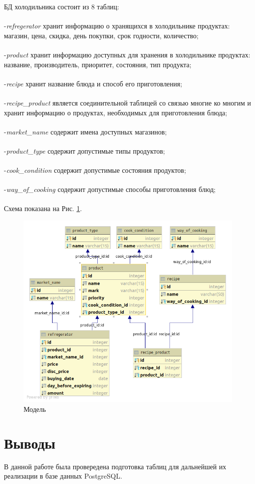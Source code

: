 \newpage
БД холодильника состоит из 8 таблиц:
\\\\-\textit{refregerator} хранит информацию о хранящихся в холодильнике продуктах: магазин, цена, скидка, день покупки, срок годности, количество;
\\\\-\textit{product} хранит информацию доступных для хранения в холодильнике продуктах: название, производитель, приоритет, состояния, тип продукта;
\\\\-\textit{recipe} хранит название блюда и способ его приготовления;
\\\\-\textit{recipe\_product} является соединительной таблицей со связью многие ко многим и хранит информацию о продуктах, необходимых для приготовления блюда;
\\\\-\textit{market\_name} содержит имена доступных магазинов;
\\\\-\textit{product\_type} содержит допустимые типы продуктов;
\\\\-\textit{cook\_condition} содержит допустимые состояния продуктов;
\\\\-\textit{way\_of\_cooking} содержит допустимые способы приготовления блюд;
\\\\




Схема показана на Рис. \ref{pic:db-schema}.

\begin{figure}[H]
	\begin{center}
		\includegraphics[scale=0.5]{refregerator.png}
		\caption{Модель} 
		\label{pic:db-schema} %
	\end{center}
\end{figure}

\section{Выводы}

В данной работе была провередена подготовка таблиц для дальнейшей их реализации в базе данных PostgreSQL.


